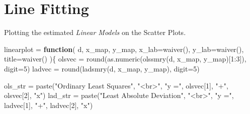 \documentclass[
]{article}
\newenvironment{Shaded}{}{}
\newcommand{\AttributeTok}[1]{\textcolor[rgb]{0.84,0.60,0.13}{#1}}
\newcommand{\ControlFlowTok}[1]{\textcolor[rgb]{0.80,0.14,0.11}{\textbf{#1}}}
\newcommand{\DecValTok}[1]{\textcolor[rgb]{0.96,0.45,0.00}{#1}}
\newcommand{\FunctionTok}[1]{\textcolor[rgb]{0.41,0.62,0.42}{#1}}
\newcommand{\NormalTok}[1]{\textcolor[rgb]{0.24,0.22,0.21}{#1}}
\newcommand{\OtherTok}[1]{\textcolor[rgb]{0.41,0.62,0.42}{#1}}
\newcommand{\SpecialCharTok}[1]{\textcolor[rgb]{0.69,0.38,0.53}{#1}}
\newcommand{\StringTok}[1]{\textcolor[rgb]{0.60,0.59,0.10}{#1}}
\begin{document}
\hypertarget{line-fitting}{%
\section{Line Fitting}\label{line-fitting}}

Plotting the estimated \emph{Linear Models} on the Scatter Plots.

\begin{Shaded}
\begin{Highlighting}[]
\NormalTok{linearplot }\OtherTok{=} \ControlFlowTok{function}\NormalTok{(}
\NormalTok{    d, x\_map, y\_map,}
    \AttributeTok{x\_lab=}\FunctionTok{waiver}\NormalTok{(), }\AttributeTok{y\_lab=}\FunctionTok{waiver}\NormalTok{(),}
    \AttributeTok{title=}\FunctionTok{waiver}\NormalTok{()}
\NormalTok{)\{}
\NormalTok{  olsvec }\OtherTok{=} \FunctionTok{round}\NormalTok{(}\FunctionTok{as.numeric}\NormalTok{(}\FunctionTok{olssmry}\NormalTok{(d, x\_map, y\_map)[}\DecValTok{1}\SpecialCharTok{:}\DecValTok{3}\NormalTok{]), }\AttributeTok{digit=}\DecValTok{5}\NormalTok{)}
\NormalTok{  ladvec }\OtherTok{=} \FunctionTok{round}\NormalTok{(}\FunctionTok{ladsmry}\NormalTok{(d, x\_map, y\_map), }\AttributeTok{digit=}\DecValTok{5}\NormalTok{)}
  
\NormalTok{  ols\_str }\OtherTok{=} \FunctionTok{paste}\NormalTok{(}\StringTok{"Ordinary Least Squares"}\NormalTok{, }\StringTok{"\textless{}br\textgreater{}"}\NormalTok{,}
                        \StringTok{"y ="}\NormalTok{, olsvec[}\DecValTok{1}\NormalTok{], }\StringTok{"+"}\NormalTok{, olsvec[}\DecValTok{2}\NormalTok{], }\StringTok{"x"}\NormalTok{)}
\NormalTok{  lad\_str }\OtherTok{=} \FunctionTok{paste}\NormalTok{(}\StringTok{"Least Absolute Deviation"}\NormalTok{, }\StringTok{"\textless{}br\textgreater{}"}\NormalTok{,}
                        \StringTok{"y ="}\NormalTok{, ladvec[}\DecValTok{1}\NormalTok{], }\StringTok{"+"}\NormalTok{, ladvec[}\DecValTok{2}\NormalTok{], }\StringTok{"x"}\NormalTok{)}
  

\end{Highlighting}
\end{Shaded}
\end{document}
